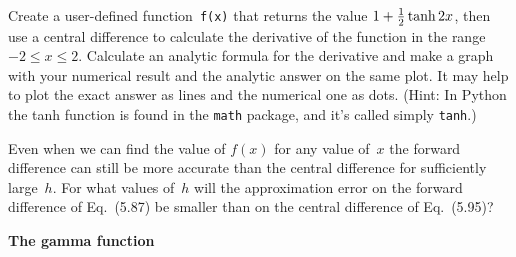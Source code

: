 \documentclass[12pt]{article}
\begin{document}
\begin{exercises}

\exercise Create a user-defined function~\verb|f(x)| that returns the value
$1 + \tfrac12 \tanh2x$, then use a central difference to calculate the
derivative of the function in the range $-2\le x\le2$.  Calculate an
analytic formula for the derivative and make a graph with your numerical
result and the analytic answer on the same plot.  It may help to plot the
exact answer as lines and the numerical one as dots.  (Hint: In Python the
tanh function is found in the \verb|math| package, and it's called simply
\verb|tanh|.)



\exercise Even when we can find the value of $f(x)$ for any value of~$x$
the forward difference can still be more accurate than the central
difference for sufficiently large~$h$.  For what values of~$h$ will the
approximation error on the forward difference of Eq.~(5.87) be smaller than
on the central difference of Eq.~(5.95)?



\exercise \textbf{The gamma function}


\end{exercises}
\end{document}
